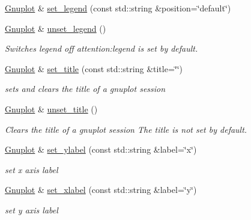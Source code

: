 \begin{DoxyCompactItemize}
\item 
\hyperlink{classGnuplot}{Gnuplot} \& \hyperlink{classGnuplot_ad64a717dac18167f656c4f09239973f8}{set\+\_\+legend} (const std\+::string \&position=\char`\"{}default\char`\"{})
\item 
\hyperlink{classGnuplot}{Gnuplot} \& \hyperlink{classGnuplot_ace901a18ab1a459213afd3ee0233b5ce}{unset\+\_\+legend} ()
\begin{DoxyCompactList}\small\item\em Switches legend off attention\+:legend is set by default. \end{DoxyCompactList}\item 
\hyperlink{classGnuplot}{Gnuplot} \& \hyperlink{classGnuplot_a4f93bac0e69dd83806652ca7226c6b3b}{set\+\_\+title} (const std\+::string \&title=\char`\"{}\char`\"{})
\begin{DoxyCompactList}\small\item\em sets and clears the title of a gnuplot session \end{DoxyCompactList}\item 
\hyperlink{classGnuplot}{Gnuplot} \& \hyperlink{classGnuplot_aca0aeb1dc0ac8d7e68ba6a15a977be28}{unset\+\_\+title} ()
\begin{DoxyCompactList}\small\item\em Clears the title of a gnuplot session The title is not set by default. \end{DoxyCompactList}\item 
\mbox{\label{classGnuplot_afcb311938827f8718f19ed52d66bad7c}} 
\hyperlink{classGnuplot}{Gnuplot} \& \hyperlink{classGnuplot_afcb311938827f8718f19ed52d66bad7c}{set\+\_\+ylabel} (const std\+::string \&label=\char`\"{}x\char`\"{})
\begin{DoxyCompactList}\small\item\em set x axis label \end{DoxyCompactList}\item 
\mbox{\label{classGnuplot_aa93589a95aeab869ba731e2583843ae4}} 
\hyperlink{classGnuplot}{Gnuplot} \& \hyperlink{classGnuplot_aa93589a95aeab869ba731e2583843ae4}{set\+\_\+xlabel} (const std\+::string \&label=\char`\"{}y\char`\"{})
\begin{DoxyCompactList}\small\item\em set y axis label \end{DoxyCompactList}\item 
\mbox{\label{classGnuplot_ab3206e715d20f05cc0dd1eec89ce8b07}} 

\end{DoxyCompactItemize}
